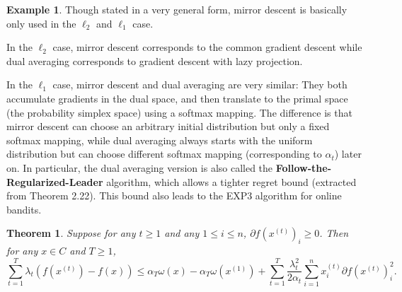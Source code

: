 \documentclass[openany]{book}
\newtheorem{theorem}{Theorem}[chapter]
\theoremstyle{definition}
\newtheorem{example}{Example}[chapter]
\theoremstyle{remark}
\begin{document}
\begin{example}
    Though stated in a very general form, mirror descent is basically only used in the $\ell_2$ and $\ell_1$ case.

    In the $\ell_2$ case, mirror descent corresponds to the common gradient descent while dual averaging corresponds to gradient descent with lazy projection.

    In the $\ell_1$ case, mirror descent and dual averaging are very similar: They both accumulate gradients in the dual space, and then translate to the primal space (the probability simplex space) using a softmax mapping. The difference is that mirror descent can choose an arbitrary initial distribution but only a fixed softmax mapping, while dual averaging always starts with the uniform distribution but can choose different softmax mapping (corresponding to $\alpha_t$) later on. In particular, the dual averaging version is also called the \textbf{Follow-the-Regularized-Leader} algorithm, which allows a tighter regret bound (extracted from \cite{S11} Theorem 2.22). This bound also leads to the EXP3 algorithm for online bandits.
\end{example}
\begin{theorem}\label{thm:DALocalNorm}
    Suppose for any $t\ge1$ and any $1\le i\le n$, $\partial f(x^{(t)})_i\ge0$. Then for any $x\in C$ and $T\ge1$,
    \begin{equation*}
        \sum_{t=1}^{T}\lambda_t\left(f(x^{(t)})-f(x)\right)\le\alpha_T\omega(x)-\alpha_T\omega(x^{(1)})+\sum_{t=1}^{T}\frac{\lambda_t^2}{2\alpha_t}\sum_{i=1}^{n}x^{(t)}_i\partial f(x^{(t)})_i^2.
    \end{equation*}
\end{theorem}
\end{document}
